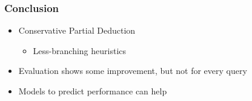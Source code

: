 \documentclass[xcolor=table]{beamer}
\begin{document}
\begin{frame}[fragile]
  \transwipe[direction=90]
  \frametitle{Conclusion}
  \begin{itemize}
    \item Conservative Partial Deduction
    \begin{itemize}
      \item Less-branching heuristics
    \end{itemize}
    \item Evaluation shows some improvement, but not for every query
    \item Models to predict performance can help
  \end{itemize}
\end{frame}











\end{document}

